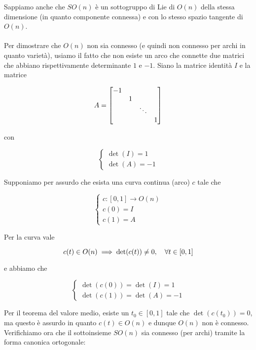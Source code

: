 Sappiamo anche che $ SO(n) $ è un sottogruppo di Lie di $ O(n) $ della stessa dimensione (in quanto componente connessa) e con lo stesso spazio tangente di $ O(n) $.\\\\
%
Per dimostrare che $ O(n) $ non sia connesso (e quindi non connesso per archi in quanto varietà), usiamo il fatto che non esiste un arco che connette due matrici che abbiano rispettivamente determinante $ 1 $ e $ -1 $. Siano la matrice identità $ I $ e la matrice

\begin{equation}
	A = \bmqty{\dmat{-1,1,\ddots,1}}
\end{equation}

con

\begin{equation}
	\begin{cases}
		\det(I) = 1 \\
		\det(A) = - 1
	\end{cases}
\end{equation}

Supponiamo per assurdo che esista una curva continua (arco) $ c $ tale che

\begin{equation}
	\begin{cases}
		c : [0,1] \to O(n) \\
		c(0) = I \\
		c(1) = A
	\end{cases}
\end{equation}

Per la curva vale

\begin{equation}
	c(t) \in O(n) \implies \det(c(t)) \neq 0 \qcomma \forall t \in [0,1]
\end{equation}

e abbiamo che

\begin{equation}
	\begin{cases}
		\det(c(0)) = \det(I) = 1 \\
		\det(c(1)) = \det(A) = - 1
	\end{cases}
\end{equation}

Per il teorema del valore medio, esiste un $ t_{0} \in [0,1] $ tale che $ \det(c(t_{0})) = 0 $, ma questo è assurdo in quanto $ c(t) \in O(n) $ e dunque $ O(n) $ non è connesso.\\
Verifichiamo ora che il sottoinsieme $ SO(n) $ sia connesso (per archi) tramite la forma canonica ortogonale:

